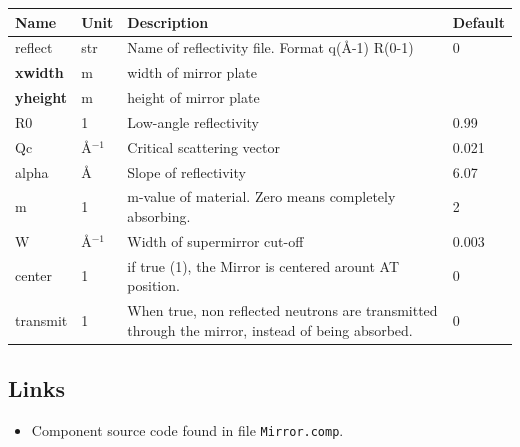 \begin{longtable}{p{}p{}p{}p{}}
\toprule
\textbf{Name} & \textbf{Unit} & \textbf{Description} & \textbf{Default} \\
\midrule
\endhead
reflect & str & Name of reflectivity file. Format q(\AA{}-1) R(0-1) & 0 \\
\textbf{xwidth} & m & width of mirror plate &  \\
\textbf{yheight} & m & height of mirror plate &  \\
R0 & 1 & Low-angle reflectivity & 0.99 \\
Qc & \AA{}$^{-1}$ & Critical scattering vector & 0.021 \\
alpha & \AA{} & Slope of reflectivity & 6.07 \\
m & 1 & m-value of material. Zero means completely absorbing. & 2 \\
W & \AA{}$^{-1}$ & Width of supermirror cut-off & 0.003 \\
center & 1 & if true (1), the Mirror is centered arount AT position. & 0 \\
transmit & 1 & When true, non reflected neutrons are transmitted through the mirror, instead of being absorbed. & 0 \\
\bottomrule
\end{longtable}

\subsection*{Links}
\begin{itemize}
  \item Component source code found in file \texttt{Mirror.comp}.
\end{itemize}
